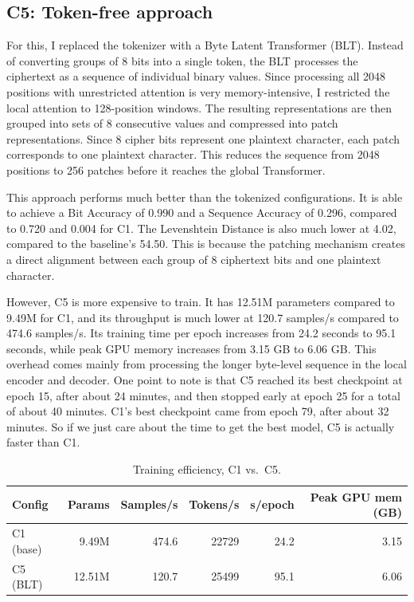 \documentclass[12pt]{article}
\begin{document}
\subsection{C5: Token-free approach}

For this, I replaced the tokenizer with a Byte Latent Transformer (BLT). Instead
of converting groups of 8 bits into a single token, the BLT processes the
ciphertext as a sequence of individual binary values. Since processing all 2048
positions with unrestricted attention is very memory-intensive, I restricted the
local attention to 128-position windows. The resulting representations are then
grouped into sets of 8 consecutive values and compressed into patch
representations. Since 8 cipher bits represent one plaintext character, each
patch corresponds to one plaintext character. This reduces the sequence from
2048 positions to 256 patches before it reaches the global Transformer.

This approach performs much better than the tokenized configurations. It is able
to achieve a Bit Accuracy of 0.990 and a Sequence Accuracy of 0.296, compared to
0.720 and 0.004 for C1. The Levenshtein Distance is also much lower at 4.02,
compared to the baseline's 54.50. This is because the patching mechanism creates
a direct alignment between each group of 8 ciphertext bits and one plaintext
character.

However, C5 is more expensive to train. It has 12.51M parameters compared to
9.49M for C1, and its throughput is much lower at 120.7 samples/s compared to
474.6 samples/s. Its training time per epoch increases from 24.2 seconds to 95.1
seconds, while peak GPU memory increases from 3.15 GB to 6.06 GB. This overhead
comes mainly from processing the longer byte-level sequence in the local encoder
and decoder. One point to note is that C5 reached its best checkpoint at epoch
15, after about 24 minutes, and then stopped early at epoch 25 for a total of
about 40 minutes. C1's best checkpoint came from epoch 79, after about 32
minutes. So if we just care about the time to get the best model, C5 is actually
faster than C1.

\begin{table}[!htb]
\centering
\small
\begin{tabular}{@{}lrrrrr@{}}
\toprule
Config & Params & Samples/s & Tokens/s & s/epoch & Peak GPU mem (GB) \\
\midrule
C1 (base) & 9.49M  & 474.6 & 22729 & 24.2 & 3.15 \\
C5 (BLT)  & 12.51M & 120.7 & 25499 & 95.1 & 6.06 \\
\bottomrule
\end{tabular}
\caption{Training efficiency, C1 vs.\ C5.}
\end{table}
\end{document}
